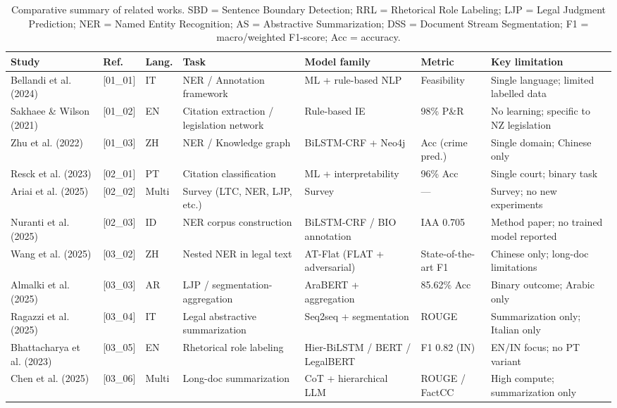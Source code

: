 \documentclass[preprint,a4paper,fleqn]{cas-dc}
\begin{document}
\begin{table}[t]
\centering
\caption{Comparative summary of related works. SBD = Sentence Boundary Detection; RRL = Rhetorical Role Labeling; LJP = Legal Judgment Prediction; NER = Named Entity Recognition; AS = Abstractive Summarization; DSS = Document Stream Segmentation; F1 = macro/weighted F1-score; Acc = accuracy.}
\label{tab:related_work}
\small
\begin{tabular}{p{3.2cm} p{1.1cm} p{1.1cm} p{2.3cm} p{2.3cm} p{1.4cm} p{3.0cm}}
\toprule
\textbf{Study} & \textbf{Ref.} & \textbf{Lang.} & \textbf{Task} & \textbf{Model family} & \textbf{Metric} & \textbf{Key limitation} \\
\midrule
Bellandi et al. (2024) & [01\_01] & IT & NER / Annotation framework & ML + rule-based NLP & Feasibility & Single language; limited labelled data \\
Sakhaee \& Wilson (2021) & [01\_02] & EN & Citation extraction / legislation network & Rule-based IE & 98\% P\&R & No learning; specific to NZ legislation \\
Zhu et al. (2022) & [01\_03] & ZH & NER / Knowledge graph & BiLSTM-CRF + Neo4j & Acc (crime pred.) & Single domain; Chinese only \\
Resck et al. (2023) & [02\_01] & PT & Citation classification & ML + interpretability & 96\% Acc & Single court; binary task \\
Ariai et al. (2025) & [02\_02] & Multi & Survey (LTC, NER, LJP, etc.) & Survey & --- & Survey; no new experiments \\
Nuranti et al. (2025) & [02\_03] & ID & NER corpus construction & BiLSTM-CRF / BIO annotation & IAA 0.705 & Method paper; no trained model reported \\
Wang et al. (2025) & [03\_02] & ZH & Nested NER in legal text & AT-Flat (FLAT + adversarial) & State-of-the-art F1 & Chinese only; long-doc limitations \\
Almalki et al. (2025) & [03\_03] & AR & LJP / segmentation-aggregation & AraBERT + aggregation & 85.62\% Acc & Binary outcome; Arabic only \\
Ragazzi et al. (2025) & [03\_04] & IT & Legal abstractive summarization & Seq2seq + segmentation & ROUGE & Summarization only; Italian only \\
Bhattacharya et al. (2023) & [03\_05] & EN & Rhetorical role labeling & Hier-BiLSTM / BERT / LegalBERT & F1 0.82 (IN) & EN/IN focus; no PT variant \\
Chen et al. (2025) & [03\_06] & Multi & Long-doc summarization & CoT + hierarchical LLM & ROUGE / FactCC & High compute; summarization only \\

\end{tabular}
\end{table}
\end{document}
